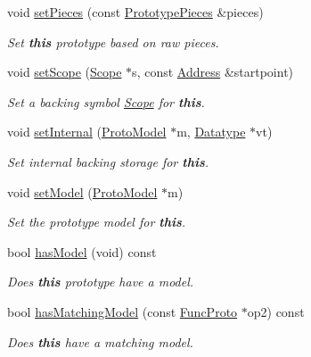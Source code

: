 \begin{DoxyCompactItemize}
void \mbox{\hyperlink{class_func_proto_a8e6f53c7733c8aa58d9138a8f3add2ce}{set\+Pieces}} (const \mbox{\hyperlink{struct_prototype_pieces}{Prototype\+Pieces}} \&pieces)
\begin{DoxyCompactList}\small\item\em Set {\bfseries{this}} prototype based on raw pieces. \end{DoxyCompactList}\item 
void \mbox{\hyperlink{class_func_proto_adc83eddece4cb123d198ad288dfa89bd}{set\+Scope}} (\mbox{\hyperlink{class_scope}{Scope}} $\ast$s, const \mbox{\hyperlink{class_address}{Address}} \&startpoint)
\begin{DoxyCompactList}\small\item\em Set a backing symbol \mbox{\hyperlink{class_scope}{Scope}} for {\bfseries{this}}. \end{DoxyCompactList}\item 
void \mbox{\hyperlink{class_func_proto_af69f89b0b3c5165e521d33b658599699}{set\+Internal}} (\mbox{\hyperlink{class_proto_model}{Proto\+Model}} $\ast$m, \mbox{\hyperlink{class_datatype}{Datatype}} $\ast$vt)
\begin{DoxyCompactList}\small\item\em Set internal backing storage for {\bfseries{this}}. \end{DoxyCompactList}\item 
void \mbox{\hyperlink{class_func_proto_ae8c14d15c7296c47deae3433687b1b15}{set\+Model}} (\mbox{\hyperlink{class_proto_model}{Proto\+Model}} $\ast$m)
\begin{DoxyCompactList}\small\item\em Set the prototype model for {\bfseries{this}}. \end{DoxyCompactList}\item 
bool \mbox{\hyperlink{class_func_proto_a6ccc21837d768462cd2abca84a5ffd59}{has\+Model}} (void) const
\begin{DoxyCompactList}\small\item\em Does {\bfseries{this}} prototype have a model. \end{DoxyCompactList}\item 
bool \mbox{\hyperlink{class_func_proto_afeebd3dd7e300e1361977b93c72a8eed}{has\+Matching\+Model}} (const \mbox{\hyperlink{class_func_proto}{Func\+Proto}} $\ast$op2) const
\begin{DoxyCompactList}\small\item\em Does {\bfseries{this}} have a matching model. \end{DoxyCompactList}\item 

\end{DoxyCompactItemize}

